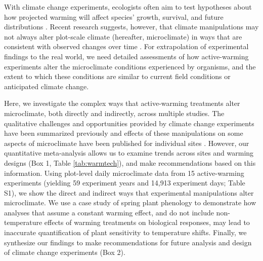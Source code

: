 \documentclass{article}
\begin{document}
\par With climate change experiments, ecologists often aim to test hypotheses about how projected warming will affect species' growth, survival, and future distributions \citep{dukes1999,hobbie1999,morin2010,pelini2011,chuine2012,reich2015,gruner2017}. Recent research suggests, however, that climate manipulations may not always alter plot-scale climate (hereafter, microclimate) in ways that are consistent with observed changes over time \citep{wolkovich2012,menke2014,polgar2014,andresen2016}. For extrapolation of experimental findings to the real world, we need detailed assessments of how active-warming experiments alter the microclimate conditions experienced by organisms, and the extent to which these conditions are similar to current field conditions or anticipated climate change. 
\par Here, we investigate the complex ways that active-warming treatments alter microclimate, both directly and indirectly, across multiple studies. The qualitative challenges and opportunities provided by climate change experiments have been summarized previously \citep[e.g.,][]{deboeck2015} and effects of these manipulations on some aspects of microclimate have been published for individual sites \citep[e.g.,][]{harte1995b,mcdaniel2014,pelini2011}. However, our quantitative meta-analysis allows us to examine trends across sites and warming designs (Box 1, Table \ref{tab:warmtech}), and make recommendations based on this information. Using plot-level daily microclimate data from 15 active-warming experiments (yielding 59 experiment years and 14,913 experiment days; Table S1), we show the direct and indirect ways that experimental manipulations alter microclimate. We use a case study of spring plant phenology to demonstrate how analyses that assume a constant warming effect, and do not include non-temperature effects of warming treatments on biological responses, may lead to inaccurate quantification of plant sensitivity to temperature shifts. Finally, we synthesize our findings to make recommendations for future analysis and design of climate change experiments (Box 2). 
\end{document}
